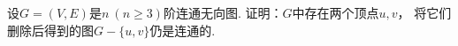 \begin{example}
设\(G = (V,E)\)是\(n\ (n\geq3)\)阶连通无向图.
证明：\(G\)中存在两个顶点\(u,v\)，
将它们删除后得到的图\(G-\{u,v\}\)仍是连通的.
\end{example}

